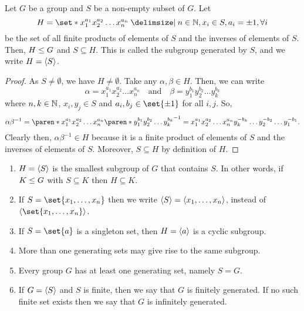 \documentclass[11pt]{penrose}
\begin{document}
\begin{nthm}
    Let $G$ be a group and $S$ be a non-empty subset of $G$. Let
    \begin{equation*}
        H = \set*{ x_{1}^{a_{1}} x_{2}^{a_{2}} \dots x_{n}^{a_{n}} \st n \in \N, x_{i} \in S, a_{i} = \pm 1, \forall i}
    \end{equation*}
    be the set of all finite products of elements of $S$ and the inverses of elements of $S$. Then, $H \mathrel{\leq} G$ and $S \subseteq H$. This is called the subgroup generated by $S$, and we write $H = \langle S\rangle$.
\end{nthm}
\begin{proof}
    As $S \neq \emptyset$, we have $H \neq \emptyset$. Take any $\alpha, \beta \in H$. Then, we can write
    \begin{equation*}
        \alpha = x_{1}^{a_{1}} x_{2}^{a_{2}} \dots x_{n}^{a_{n}}
        \quad\text{and}\quad
        \beta = y_{1}^{b_{1}} y_{2}^{b_{2}} \dots y_{k}^{b_{k}}
    \end{equation*}
    where $n, k \in \mathbb{N}$, $x_{i}, y_{j} \in S$ and $a_{i}, b_{j} \in \set{\pm 1}$ for all $i, j$. So,
    \begin{equation*}
        \alpha \beta^{-1}
        = \paren*{ x_{1}^{a_{1}} x_{2}^{a_{2}} \dots x_{n}^{a_{n}} } \paren*{ y_{1}^{b_{1}} y_{2}^{b_{2}} \dots y_{k}^{b_{k}} }^{-1}
        = x_{1}^{a_{1}} x_{2}^{a_{2}} \dots x_{n}^{a_{n}} y_{k}^{-b_{k}} \dots y_{2}^{-b_{2}} \dots y_{1}^{-b_{1}}.
    \end{equation*}
    Clearly then, $\alpha\beta^{-1} \in H$ because it is a finite product of elements of $S$ and the inverses of elements of $S$. Moreover, $S \subseteq H$ by definition of $H$.
\end{proof}

\begin{remark}\phantom{}
    \begin{enumerate}
        \item $H = \langle S\rangle$ is the smallest subgroup of $G$ that contains $S$. In other words, if $K \mathrel{\leq} G$ with $S \subseteq K$ then $H \subseteq K$.
        \item If $S = \set{x_{1}, \dots, x_{n}}$ then we write $\langle S\rangle = \langle x_{1}, \dots, x_{n}\rangle$, instead of $\cyclic{\set{x_{1}, \dots, x_{n}}}$.
        \item If $S = \set{a}$ is a singleton set, then $H = \langle a\rangle$ is a cyclic subgroup.
        \item More than one generating sets may give rise to the same subgroup.
        \item Every group $G$ has at least one generating set, namely $S = G$.
        \item If $G = \langle S\rangle$ and $S$ is finite, then we say that $G$ is finitely generated. If no such finite set exists then we say that $G$ is infinitely generated.
    \end{enumerate}
\end{remark}
\end{document}
